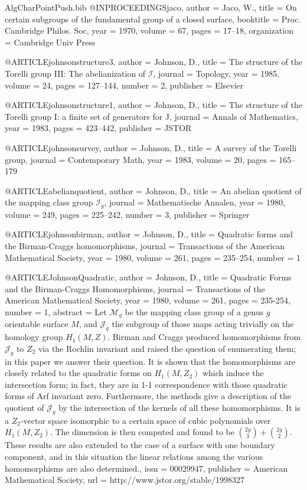 \documentclass[a4paper]{amsproc}
\theoremstyle{TheoremNum}
\theoremstyle{Theorembold}
\theoremstyle{TheoremboldDef}
\theoremstyle{TheoremboldRem}
\theoremstyle{TheoremboldRem}
\begin{document}
\begin{filecontents}{AlgCharPointPush.bib}
@INPROCEEDINGS{jaco,
  author = {Jaco, W.},
  title = {On certain subgroups of the fundamental group of a closed surface},
  booktitle = {Proc. Cambridge Philos. Soc},
  year = {1970},
  volume = {67},
  pages = {17--18},
  organization = {Cambridge Univ Press}
}

@ARTICLE{johnsonstructure3,
  author = {Johnson, D.},
  title = {The structure of the {T}orelli group {III}: The abelianization of
	$\mathcal{I}$},
  journal = {Topology},
  year = {1985},
  volume = {24},
  pages = {127--144},
  number = {2},
  publisher = {Elsevier}
}

@ARTICLE{johnsonstructure1,
  author = {Johnson, D.},
  title = {The structure of the {T}orelli group {I}: a finite set of generators
	for J},
  journal = {Annals of Mathematics},
  year = {1983},
  pages = {423--442},
  publisher = {JSTOR}
}

@ARTICLE{johnsonsurvey,
  author = {Johnson, D.},
  title = {A survey of the Torelli group},
  journal = {Contemporary Math},
  year = {1983},
  volume = {20},
  pages = {165--179}
}

@ARTICLE{abelianquotient,
  author = {Johnson, D.},
  title = {An abelian quotient of the mapping class group $\mathcal{I}_g$},
  journal = {Mathematische Annalen},
  year = {1980},
  volume = {249},
  pages = {225--242},
  number = {3},
  publisher = {Springer}
}

@ARTICLE{johnsonbirman,
  author = {Johnson, D.},
  title = {Quadratic forms and the {B}irman-{C}raggs homomorphisms},
  journal = {Transactions of the American Mathematical Society},
  year = {1980},
  volume = {261},
  pages = {235--254},
  number = {1}
}

@ARTICLE{JohnsonQuadratic,
  author = {Johnson, D.},
  title = {Quadratic Forms and the Birman-Craggs Homomorphisms},
  journal = {Transactions of the American Mathematical Society},
  year = {1980},
  volume = {261},
  pages = {235-254},
  number = {1},
  abstract = {Let $\mathscr{M}_g$ be the mapping class group of a genus $g$ orientable
	surface $M$, and $\mathscr{J}_g$ the subgroup of those maps acting
	trivially on the homology group $H_1(M, Z)$. Birman and Craggs produced
	homomorphisms from $\mathscr{J}_g$ to $Z_2$ via the Rochlin invariant
	and raised the question of enumerating them; in this paper we answer
	their question. It is shown that the homomorphisms are closely related
	to the quadratic forms on $H_1(M, Z_2)$ which induce the intersection
	form; in fact, they are in 1-1 correspondence with those quadratic
	forms of Arf invariant zero. Furthermore, the methods give a description
	of the quotient of $\mathscr{J}_g$ by the intersection of the kernels
	of all these homomorphisms. It is a $Z_2$-vector space isomorphic
	to a certain space of cubic polynomials over $H_1(M, Z_2)$. The dimension
	is then computed and found to be $\binom{2g}{3} + \binom{2g}{2}$.
	These results are also extended to the case of a surface with one
	boundary component, and in this situation the linear relations among
	the various homomorphisms are also determined.},
  issn = {00029947},
  publisher = {American Mathematical Society},
  url = {http://www.jstor.org/stable/1998327}
}


\end{filecontents}
\end{document}
